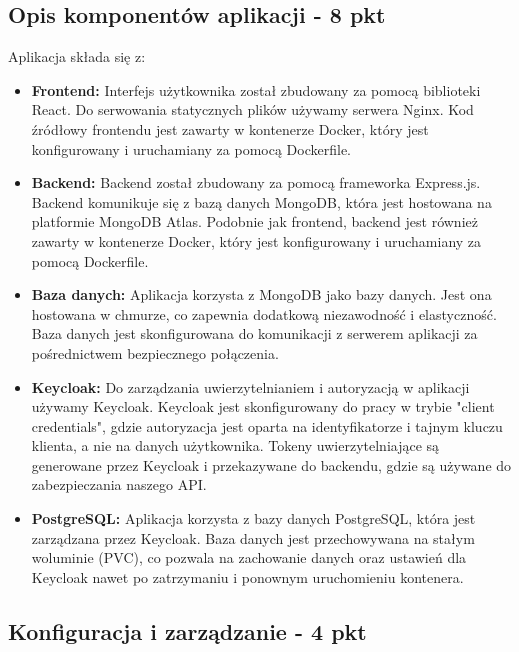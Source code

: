 \documentclass[12pt,a4paper]{article}
\begin{document}
\subsection{Opis komponentów aplikacji - 8 pkt}
\label{sec:FunctionalConditions}

Aplikacja składa się z:

\begin{itemize}
\item \textbf{Frontend:} Interfejs użytkownika został zbudowany za pomocą biblioteki React. Do serwowania statycznych plików używamy serwera Nginx. Kod źródłowy frontendu jest zawarty w kontenerze Docker, który jest konfigurowany i uruchamiany za pomocą Dockerfile.

\item \textbf{Backend:} Backend został zbudowany za pomocą frameworka Express.js. Backend komunikuje się z bazą danych MongoDB, która jest hostowana na platformie MongoDB Atlas. Podobnie jak frontend, backend jest również zawarty w kontenerze Docker, który jest konfigurowany i uruchamiany za pomocą Dockerfile.

\item \textbf{Baza danych:} Aplikacja korzysta z MongoDB jako bazy danych. Jest ona hostowana w chmurze, co zapewnia dodatkową niezawodność i elastyczność. Baza danych jest skonfigurowana do komunikacji z serwerem aplikacji za pośrednictwem bezpiecznego połączenia.

\item \textbf{Keycloak:} Do zarządzania uwierzytelnianiem i autoryzacją w aplikacji używamy Keycloak. Keycloak jest skonfigurowany do pracy w trybie "client credentials", gdzie autoryzacja jest oparta na identyfikatorze i tajnym kluczu klienta, a nie na danych użytkownika. Tokeny uwierzytelniające są generowane przez Keycloak i przekazywane do backendu, gdzie są używane do zabezpieczania naszego API.

\item \textbf{PostgreSQL:} Aplikacja korzysta z bazy danych PostgreSQL, która jest zarządzana przez Keycloak. Baza danych jest przechowywana na stałym woluminie (PVC), co pozwala na zachowanie danych oraz ustawień dla Keycloak nawet po zatrzymaniu i ponownym uruchomieniu kontenera.
\end{itemize}

\subsection{Konfiguracja i zarządzanie - 4 pkt}
\label{sec:NonFunctionalConditions}
\end{document}
